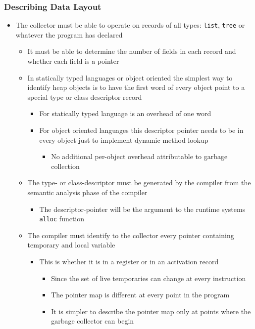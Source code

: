 \documentclass[11pt]{article}
\begin{document}
\subsubsection{Describing Data Layout}
\label{sec:orga5b7271}
\begin{itemize}
\item The collector must be able to operate on records of all types: \texttt{list}, \texttt{tree} or whatever the program has declared
\begin{itemize}
\item It must be able to determine the number of fields in each record and whether each field is a pointer
\item In statically typed languages or object oriented the simplest way to identify heap objects is to have the first word of every object point to a special type or class descriptor record
\begin{itemize}
\item For statically typed language is an overhead of one word
\item For object oriented languages this descriptor pointer needs to be in every object just to implement dynamic method lookup
\begin{itemize}
\item No additional per-object overhead attributable to garbage collection
\end{itemize}
\end{itemize}
\item The type- or class-descriptor must be generated by the compiler from the semantic analysis phase of the compiler
\begin{itemize}
\item The descriptor-pointer will be the argument to the runtime systems \texttt{alloc} function
\end{itemize}
\item The compiler must identify to the collector every pointer containing temporary and local variable
\begin{itemize}
\item This is whether it is in a register or in an activation record
\begin{itemize}
\item Since the set of live temporaries can change at every instruction
\item The pointer map is different at every point in the program
\item It is simpler to describe the pointer map only at points where the garbage collector can begin

\end{itemize}
\end{itemize}
\end{itemize}
\end{itemize}
\end{document}
